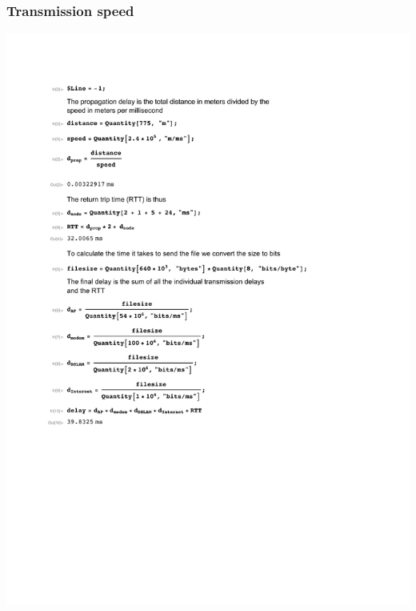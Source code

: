 \documentclass[a4paper]{article}
\begin{document}
\subsubsection{Transmission speed}
\includegraphics{../calc1.pdf}
\newpage
\end{document}
